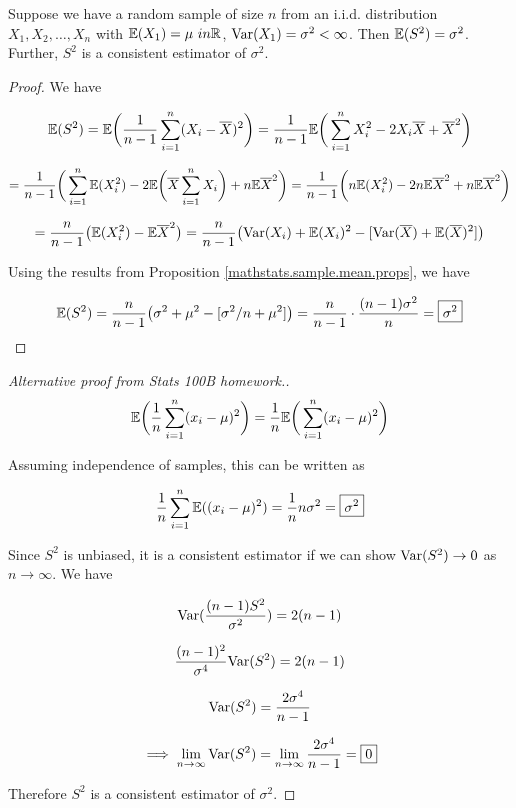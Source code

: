 \begin{proposition} Suppose we have a random sample of size \(n\) from an i.i.d. distribution \(X_1, X_2, \ldots, X_n\) with \(\E(X_1) = \mu \ in \mathbb{R}\), \(\Var(X_1) = \sigma^2 < \infty\). Then \(\E(S^2) = \sigma^2\). Further, \(S^2\) is a consistent estimator of \(\sigma^2\).

\end{proposition}

\begin{proof}

We have

\[
\E(S^2) = \E \bigg( \frac{1}{n-1} \sum_{i=1}^n (X_i - \overline{X})^2 \bigg) = \frac{1}{n-1}  \E \bigg( \sum_{i=1}^n X_i^2 - 2X_i\overline{X} + \overline{X}^2 \bigg)
\]

\[
= \frac{1}{n-1} \bigg( \sum_{i=1}^n  \E(X_i^2)  - 2 \E \bigg( \overline{X}  \sum_{i=1}^n  X_i \bigg) + n \E\overline{X}^2 \bigg)  = \frac{1}{n-1} \bigg(  n \E(X_i^2)  - 2n \E  \overline{X}^2  + n \E\overline{X}^2 \bigg)
\]

\[
= \frac{n}{n-1} \big(   \E(X_i^2)  -  \E  \overline{X}^2 \big) = \frac{n}{n-1} \big(  \Var(X_i) + \E(X_i)^2 - [\Var(\overline{X}) + \E( \overline{X})^2] \big)
\]

Using the results from Proposition \ref{mathstats.sample.mean.props}, we have

\[
\E(S^2) = \frac{n}{n-1} \big(  \sigma^2 + \mu^2 - [ \sigma^2/n + \mu^2] \big)  = \frac{n}{n-1} \cdot \frac{(n-1) \sigma^2}{n}  = \boxed{\sigma^2}
\]

\end{proof}

\begin{proof}[Alternative proof from Stats 100B homework.]

\[
\E\bigg( \frac{1}{n} \sum_{i=1}^n(x_i - \mu)^2  \bigg) = \frac{1}{n}  \E\bigg( \sum_{i=1}^n(x_i - \mu)^2  \bigg)
\]

Assuming independence of samples, this can be written as

\[
\frac{1}{n}  \sum_{i=1}^n  \E( (x_i - \mu)^2) = \frac{1}{n} n \sigma^2 = \boxed{\sigma^2}
\]

Since \(S^2\) is unbiased, it is a consistent estimator if we can show \(\Var(S^2) \to 0\)  as \( n \to \infty\). We have

\[
\Var(\frac{(n-1)S^2}{\sigma^2}) = 2(n-1)
\]

\[
\frac{(n-1)^2}{\sigma^4}\Var(S^2) = 2(n-1)
\]

\[
\Var(S^2) = \frac{2\sigma^4}{n-1}
\]

\[
\implies \lim_{n \to \infty} \Var(S^2) =  \lim_{n \to \infty}  \frac{2\sigma^4}{n-1} = \boxed{0}
\]

Therefore \(S^2\) is a consistent estimator of \(\sigma^2\).

\end{proof}

